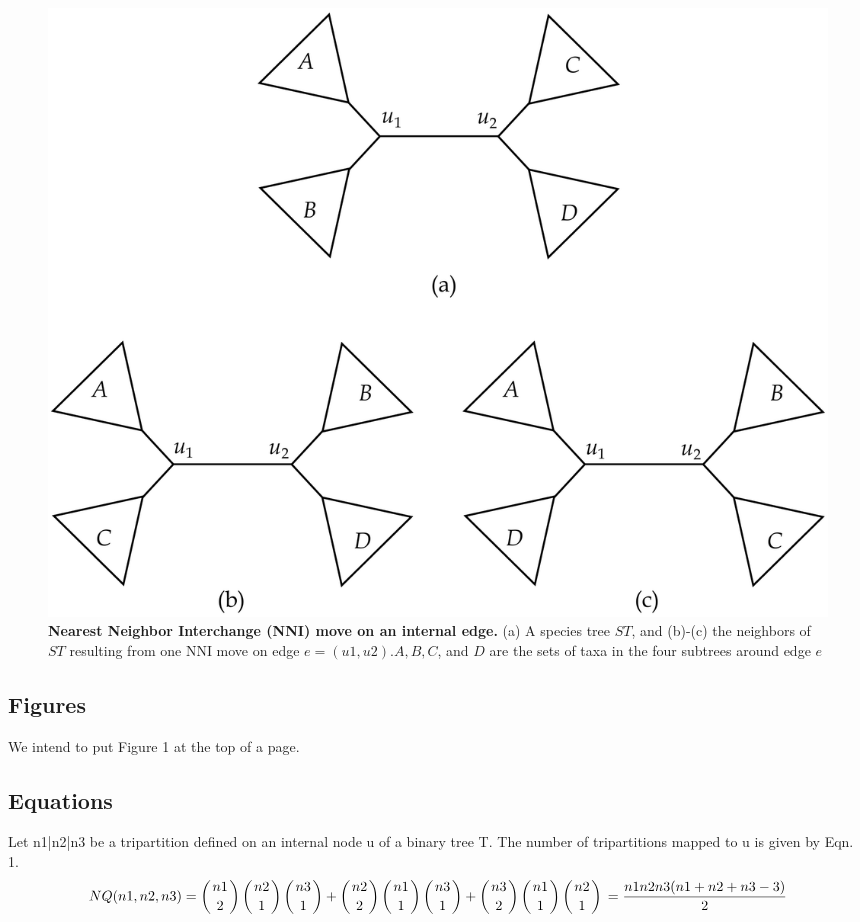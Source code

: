 \documentclass[9pt,a4paper]{article}
\begin{document}
\newpage
\begin{figure}[h]
	\centering
	\includegraphics[scale=0.4]{Figure3.pdf}
	\caption{\textbf{Nearest Neighbor Interchange (NNI) move on an internal edge.} (a)
A species tree $ST$, and (b)-(c) the neighbors of $ST$ resulting from one NNI move on edge
$e = (u1, u2). A, B, C$, and $D$ are the sets of taxa in the four subtrees around edge $e$}
\end{figure}
\subsection{Figures}
We intend to put Figure 1 at the top of a page.
\subsection{Equations}
Let n1|n2|n3 be a tripartition defined on an internal node u of a binary tree T. The number of tripartitions mapped to u is given by Eqn. 1.
\begin{equation}
 NQ(n1,n2,n3) = \left (n1 \atop 2 \right )\left (n2 \atop 1 \right )\left (n3 \atop 1 \right ) +  \left (n2 \atop 2 \right )\left (n1 \atop 1 \right )\left (n3 \atop 1 \right ) +  \left (n3 \atop 2 \right )\left (n1 \atop 1 \right )\left (n2 \atop 1 \right )\\ 
 = \frac{n1n2n3(n1+n2+n3-3)}{2}
\end{equation}  
\end{document}
